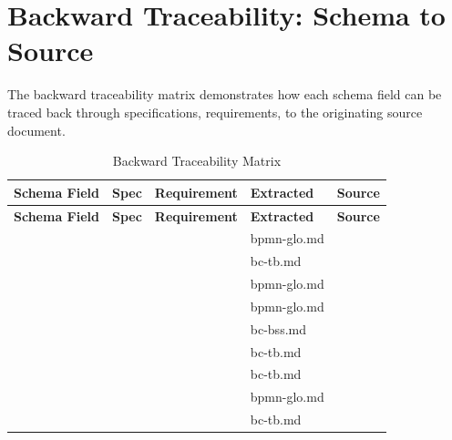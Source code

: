 \section{Backward Traceability: Schema to Source}
\label{sec:backward-traceability}

The backward traceability matrix demonstrates how each schema field
can be traced back through specifications, requirements, to the
originating source document.

\begin{longtable}{@{}L{3cm}C{2cm}C{2.5cm}C{2.5cm}C{2.5cm}@{}}
\caption{Backward Traceability Matrix}
\label{tab:backward-traceability} \\
\toprule
\textbf{Schema Field} & \textbf{Spec} & \textbf{Requirement} & \textbf{Extracted} & \textbf{Source} \\
\midrule
\endfirsthead
\toprule
\textbf{Schema Field} & \textbf{Spec} & \textbf{Requirement} & \textbf{Extracted} & \textbf{Source} \\
\midrule
\endhead
{} &  &  & bpmn-glo.md &  \\
 &  &  & bc-tb.md &  \\
 &  &  & bpmn-glo.md &  \\
 &  &  & bpmn-glo.md &  \\
 &  &  & bc-bss.md &  \\
 &  &  & bc-tb.md &  \\
 &  &  & bc-tb.md &  \\
 &  &  & bpmn-glo.md &  \\
 &  &  & bc-tb.md &  \\
\bottomrule
\end{longtable}


